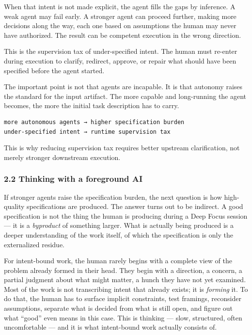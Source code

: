 \documentclass[
  nonatbib,
  preprint]{article}
\begin{document}
When that intent is not made explicit, the agent fills the gaps by
inference. A weak agent may fail early. A stronger agent can proceed
further, making more decisions along the way, each one based on
assumptions the human may never have authorized. The result can be
competent execution in the wrong direction.

This is the supervision tax of under-specified intent. The human must
re-enter during execution to clarify, redirect, approve, or repair what
should have been specified before the agent started.

The important point is not that agents are incapable. It is that
autonomy raises the standard for the input artifact. The more capable
and long-running the agent becomes, the more the initial task
description has to carry.

\begin{verbatim}
more autonomous agents → higher specification burden
under-specified intent → runtime supervision tax
\end{verbatim}

This is why reducing supervision tax requires better upstream
clarification, not merely stronger downstream execution.

\subsubsection{\texorpdfstring{\textbf{2.2 Thinking with a foreground
AI}}{2.2 Thinking with a foreground AI}}\label{thinking-with-a-foreground-ai}

If stronger agents raise the specification burden, the next question is
how high-quality specifications are produced. The answer turns out to be
indirect. A good specification is not the thing the human is producing
during a Deep Focus session --- it is a \emph{byproduct} of something
larger. What is actually being produced is a deeper understanding of the
work itself, of which the specification is only the externalized
residue.

For intent-bound work, the human rarely begins with a complete view of
the problem already formed in their head. They begin with a direction, a
concern, a partial judgment about what might matter, a hunch they have
not yet examined. Most of the work is not transcribing intent that
already exists; it is \emph{forming} it. To do that, the human has to
surface implicit constraints, test framings, reconsider assumptions,
separate what is decided from what is still open, and figure out what
``good'' even means in this case. This is thinking --- slow, structured,
often uncomfortable --- and it is what intent-bound work actually
consists of.
\end{document}
